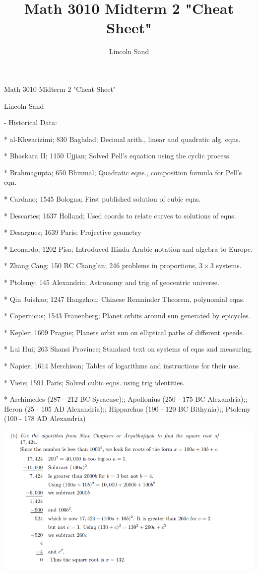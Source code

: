 \documentclass{article}
\title{Math 3010 Midterm 2 "Cheat Sheet"}
\author{Lincoln Sand}
\begin{document}
Math 3010 Midterm 2 "Cheat Sheet"

Lincoln Sand

- Historical Data:

* al-Khwarizimi; 830 Baghdad; Decimal arith., linear and quadratic alg. eqns.

* Bhaskara II; 1150 Ujjian; Solved Pell's equation using the cyclic process.

* Brahmagupta; 650 Bhinmal; Quadratic eqns., composition formula for Pell's eqn.

* Cardano; 1545 Bologna; First published solution of cubic eqns.

* Descartes; 1637 Holland; Used coords to relate curves to solutions of eqns.

* Desargues; 1639 Paris; Projective geometry

* Leonardo; 1202 Pisa; Introduced Hindu-Arabic notation and algebra to Europe.

* Zhang Cang; 150 BC Chang'an; 246 problems in proportions, $3 \times 3$ systems.

* Ptolemy; 145 Alexandria; Astronomy and trig of geocentric universe.

* Qin Juishao; 1247 Hangzhou; Chinese Remainder Theorem, polynomial eqns.

* Copernicus; 1543 Frauenberg; Planet orbits around sun generated by epicycles.

* Kepler; 1609 Prague; Planets orbit sun on elliptical paths of different speeds.

* Lui Hui; 263 Shansi Province; Standard text on systems of eqns and measuring.

* Napier; 1614 Merchison; Tables of logarithms and instructions for their use.

* Viete; 1591 Paris; Solved cubic eqns. using trig identities.

* Archimedes (287 - 212 BC Syracuse);; Apollonius (250 - 175 BC Alexandria);; Heron (25 - 105 AD Alexandria);; Hipparchus (190 - 120 BC Bithynia);; Ptolemy (100 - 178 AD Alexandria) 

\includegraphics[width=\linewidth]{square_root_algorithm}
\end{document}
